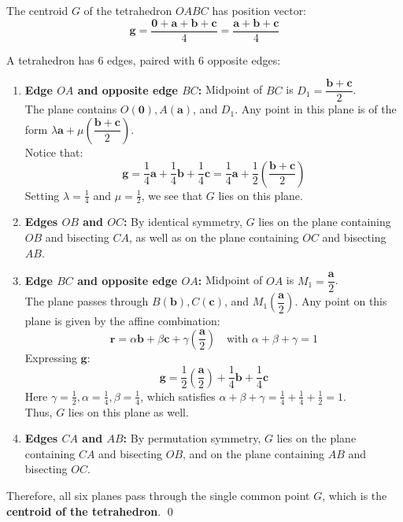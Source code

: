\documentclass[11pt,a4paper]{article}
\begin{document}
The centroid $G$ of the tetrahedron $OABC$ has position vector:
$$\mathbf{g} = \frac{\mathbf{0} + \mathbf{a} + \mathbf{b} + \mathbf{c}}{4} = \frac{\mathbf{a} + \mathbf{b} + \mathbf{c}}{4}$$

A tetrahedron has 6 edges, paired with 6 opposite edges:
\begin{enumerate}
    \item \textbf{Edge $OA$ and opposite edge $BC$:} Midpoint of $BC$ is $D_1 = \dfrac{\mathbf{b} + \mathbf{c}}{2}$.\\
    The plane contains $O(\mathbf{0}), A(\mathbf{a})$, and $D_1$. Any point in this plane is of the form $\lambda \mathbf{a} + \mu \left(\dfrac{\mathbf{b} + \mathbf{c}}{2}\right)$.\\
    Notice that:
    $$\mathbf{g} = \frac{1}{4}\mathbf{a} + \frac{1}{4}\mathbf{b} + \frac{1}{4}\mathbf{c} = \frac{1}{4}\mathbf{a} + \frac{1}{2}\left(\frac{\mathbf{b} + \mathbf{c}}{2}\right)$$
    Setting $\lambda = \frac{1}{4}$ and $\mu = \frac{1}{2}$, we see that $G$ lies on this plane.
    
    \item \textbf{Edges $OB$ and $OC$:} By identical symmetry, $G$ lies on the plane containing $OB$ and bisecting $CA$, as well as on the plane containing $OC$ and bisecting $AB$.
    
    \item \textbf{Edge $BC$ and opposite edge $OA$:} Midpoint of $OA$ is $M_1 = \dfrac{\mathbf{a}}{2}$.\\
    The plane passes through $B(\mathbf{b}), C(\mathbf{c})$, and $M_1\left(\dfrac{\mathbf{a}}{2}\right)$. Any point on this plane is given by the affine combination:
    $$\mathbf{r} = \alpha \mathbf{b} + \beta \mathbf{c} + \gamma \left(\frac{\mathbf{a}}{2}\right) \quad \text{with } \alpha + \beta + \gamma = 1$$
    Expressing $\mathbf{g}$:
    $$\mathbf{g} = \frac{1}{2}\left(\frac{\mathbf{a}}{2}\right) + \frac{1}{4}\mathbf{b} + \frac{1}{4}\mathbf{c}$$
    Here $\gamma = \frac{1}{2}, \alpha = \frac{1}{4}, \beta = \frac{1}{4}$, which satisfies $\alpha + \beta + \gamma = \frac{1}{4} + \frac{1}{4} + \frac{1}{2} = 1$.\\
    Thus, $G$ lies on this plane as well.
    
    \item \textbf{Edges $CA$ and $AB$:} By permutation symmetry, $G$ lies on the plane containing $CA$ and bisecting $OB$, and on the plane containing $AB$ and bisecting $OC$.
\end{enumerate}
Therefore, all six planes pass through the single common point $G$, which is the \textbf{centroid of the tetrahedron}. \qed
\end{document}
